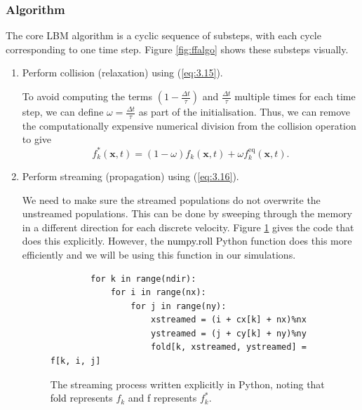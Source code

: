 \documentclass[a4paper, 11pt]{report}
\begin{document}
\subsubsection{Algorithm}
The core LBM algorithm is a cyclic sequence of substeps, with each cycle corresponding to one time step. Figure \ref{fig:ffalgo} shows these substeps visually.
\begin{enumerate}
    \item Perform collision (relaxation) using (\ref{eq:3.15}). \par To avoid computing the terms $\left(1-\frac{\Delta t}{\tau}\right)$ and $\frac{\Delta t}{\tau}$ multiple times for each time step, we can define $\omega = \frac{\Delta t}{\tau}$ as part of the initialisation. Thus, we can remove the computationally expensive numerical division from the collision operation to give
    \begin{equation}
        f_k^*(\mathbf{x},t) = (1-\omega)f_k(\mathbf{x},t) + \omega f_k^{\mathrm{eq}}(\mathbf{x},t). \label{eq:3.17}
    \end{equation}
    \item Perform streaming (propagation) using (\ref{eq:3.16}). \par We need to make sure the streamed populations do not overwrite the unstreamed populations. This can be done by sweeping through the memory in a different direction for each discrete velocity. Figure \ref{fig:streamexp} gives the code that does this explicitly. However, the {\selectfont\textcolor{black}{numpy.roll}} Python function does this more efficiently and we will be using this function in our simulations.
    \begin{figure}[!htb]{\small
    \begin{mdframed}[backgroundcolor=red!10, linecolor=red!10]
    \begin{verbatim}
        for k in range(ndir):
            for i in range(nx):
                for j in range(ny):
                    xstreamed = (i + cx[k] + nx)%nx
                    ystreamed = (j + cy[k] + ny)%ny
                    fold[k, xstreamed, ystreamed] = f[k, i, j]
    \end{verbatim}
    \end{mdframed}
    }
    \caption[The streaming process written explicitly in Python]{The streaming process written explicitly in Python, noting that {\selectfont\textcolor{black}{fold}} represents $f_k$ and {\selectfont\textcolor{black}{f}} represents $f_k^*$.} \label{fig:streamexp}
    \end{figure}


\end{enumerate}
\end{document}
